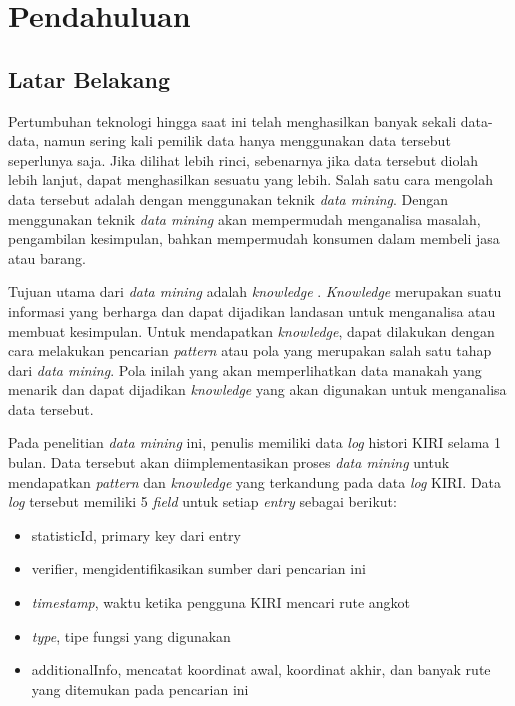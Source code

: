 \chapter{Pendahuluan}
\label{chap:intro}

\section{Latar Belakang}
\label{sec:motivation}

Pertumbuhan teknologi hingga saat ini telah menghasilkan banyak sekali data-data, namun sering kali pemilik data hanya menggunakan data tersebut seperlunya saja. Jika dilihat lebih rinci, sebenarnya jika data tersebut diolah lebih lanjut, dapat menghasilkan sesuatu yang lebih. Salah satu cara mengolah data tersebut adalah dengan menggunakan teknik \textsl{data mining}. Dengan menggunakan teknik \textsl{data mining} akan mempermudah menganalisa masalah, pengambilan kesimpulan, bahkan mempermudah konsumen dalam membeli jasa atau barang.

Tujuan utama dari \textsl{data mining} adalah \textsl{knowledge} \cite{DM}. \textsl{Knowledge} merupakan suatu informasi yang berharga dan dapat dijadikan landasan untuk menganalisa atau membuat kesimpulan. Untuk mendapatkan \textsl{knowledge}, dapat dilakukan dengan cara melakukan pencarian \textsl{pattern} atau pola yang merupakan salah satu tahap dari \textsl{data mining}. Pola inilah yang akan memperlihatkan data manakah yang menarik dan dapat dijadikan \textsl{knowledge} yang akan digunakan untuk menganalisa data tersebut.

Pada penelitian \textsl{data mining} ini, penulis memiliki data \textsl{log} histori KIRI selama 1 bulan. Data tersebut akan diimplementasikan proses \textsl{data mining} untuk mendapatkan \textsl{pattern} dan \textsl{knowledge} yang terkandung pada data \textsl{log} KIRI. Data \textsl{log} tersebut memiliki 5 \textsl{field} untuk setiap \textsl{entry} sebagai berikut:
\begin{itemize}
	\item statisticId, primary key dari entry
	\item verifier, mengidentifikasikan sumber dari pencarian ini
	\item \textsl{timestamp}, waktu ketika pengguna KIRI mencari rute angkot
	\item \textsl{type}, tipe fungsi yang digunakan
	\item additionalInfo, mencatat koordinat awal, koordinat akhir, dan banyak rute yang ditemukan pada pencarian ini
\end{itemize}
  
